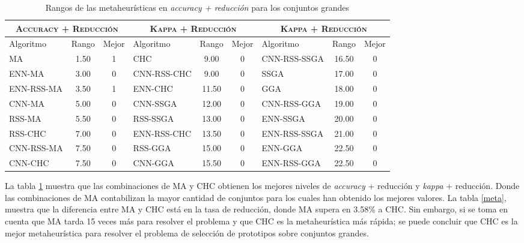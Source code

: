 \begin{table}[]
\centering
\begin{adjustbox}{max width =\textwidth}
\begin{tabular}{l c c|l c c|l c c}
\hline
\multicolumn{3}{c|}{\textsc{Accuracy + Reducción}}
	& \multicolumn{3}{c}{\textsc{Kappa + Reducción}}
	& \multicolumn{3}{c}{\textsc{Kappa + Reducción}} \\
\hline
Algoritmo & Rango & Mejor & Algoritmo & Rango & Mejor & Algoritmo & Rango & Mejor \\
\hline
\hline

MA           & 1.50  & 1 & CHC          & 9.00  & 0 & CNN-RSS-SSGA & 16.50 & 0 \\
ENN-MA       & 3.00  & 0 & CNN-RSS-CHC  & 9.00  & 0 & SSGA         & 17.00 & 0 \\
ENN-RSS-MA   & 3.50  & 1 & ENN-CHC      & 11.50 & 0 & GGA          & 18.00 & 0 \\
CNN-MA       & 5.00  & 0 & CNN-SSGA     & 12.00 & 0 & CNN-RSS-GGA  & 19.00 & 0 \\
RSS-MA       & 5.50  & 0 & RSS-SSGA     & 13.00 & 0 & ENN-SSGA     & 20.00 & 0 \\
RSS-CHC      & 7.00  & 0 & ENN-RSS-CHC  & 13.50 & 0 & ENN-RSS-SSGA & 21.00 & 0 \\
CNN-RSS-MA   & 7.50  & 0 & RSS-GGA      & 15.00 & 0 & ENN-GGA      & 22.50 & 0 \\
CNN-CHC      & 7.50  & 0 & CNN-GGA      & 15.50 & 0 & ENN-RSS-GGA  & 22.50 & 0 \\

 

\hline
\end{tabular}
\end{adjustbox}
\caption{Rangos de las metaheurísticas en \emph{accuracy + reducción} para los conjuntos grandes}
\label{rank-large}
\end{table}

La tabla \ref{rank-large} muestra que las combinaciones de MA y CHC obtienen los mejores niveles de \emph{accuracy} + reducción y \emph{kappa} + reducción. Donde las combinaciones de MA contabilizan la mayor cantidad de conjuntos para los cuales han obtenido los mejores valores. La tabla \ref{meta}, muestra que la diferencia entre MA y CHC está en la tasa de reducción, donde MA supera en 3.58\% a CHC. Sin embargo, si se toma en cuenta que MA tarda 15 veces más para resolver el problema y que CHC es la metaheurística más rápida; se puede concluir que CHC es la mejor metaheurística para resolver el problema de selección de prototipos sobre conjuntos grandes.


